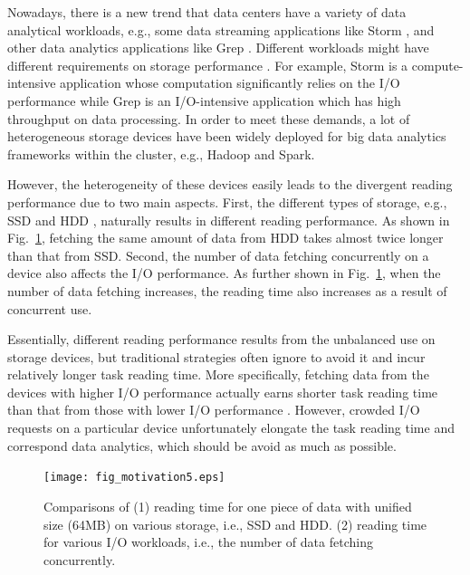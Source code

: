 \documentclass[conference]{IEEEtran}
\begin{document}
Nowadays, there is a new trend that data centers have a variety of data analytical workloads, e.g., some data streaming applications like Storm
\cite{b40}, and other data analytics applications like Grep \cite{b27}. Different workloads might have different requirements on storage performance \cite{b28} \cite{b29} \cite{b30} \cite{b31}. For example, Storm is a compute-intensive application whose computation significantly relies on the I/O performance while Grep is an I/O-intensive application which has high throughput on data processing. In order to meet these demands, a lot of heterogeneous storage devices \cite{b6} have been widely deployed for big data analytics frameworks within the cluster, e.g., Hadoop \cite{b14} and Spark\cite{b15}.

However, the heterogeneity of these devices easily leads to the divergent reading performance due to two main aspects. First, the different types of storage, e.g., SSD \cite{b32} and HDD \cite{b33}, naturally results in different reading performance. As shown in Fig.~\ref{Fig:motivation}, fetching the same amount of data from HDD takes almost twice longer than that from SSD. Second, the number of data fetching concurrently on a device also affects the I/O performance. As further shown in Fig.~\ref{Fig:motivation}, when the number of data fetching increases, the reading time also increases as a result of concurrent use.%

Essentially, different reading performance results from the unbalanced use on storage devices, but traditional strategies \cite{b2} \cite{b3} \cite{b4} \cite{b5} often ignore to avoid it  and incur relatively longer task reading time. More specifically, fetching data from the devices with higher I/O performance actually earns shorter task reading time than that from those with lower I/O performance \cite{b7}. However, crowded I/O requests on a particular device unfortunately elongate the task reading time and correspond data analytics, which should be avoid as much as possible. 

\begin{figure}[!t]
	\centering
	\texttt{[image: fig\_motivation5.eps]}
	\caption{Comparisons of (1) reading time for one piece of data with unified size (64MB) on various storage, i.e., SSD and HDD. (2) reading time for various I/O workloads, i.e., the number of data fetching concurrently.}
	\label{Fig:motivation}

\end{figure} 
\end{document}
